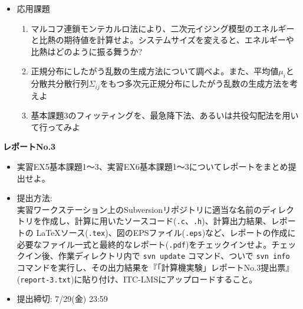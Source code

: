 \documentclass[11pt]{jarticle}
\begin{document}
\begin{itemize}
\item 応用課題
  \begin{enumerate}
  \item マルコフ連鎖モンテカルロ法により、二次元イジング模型のエネルギーと比熱の期待値を計算せよ。システムサイズを変えると、エネルギーや比熱はどのように振る舞うか?
  \item 正規分布にしたがう乱数の生成方法について調べよ。また、平均値$\mu_i$と分散共分散行列$\Sigma_{ij}$をもつ多次元正規分布にしたがう乱数の生成方法を考えよ
  \item 基本課題3のフィッティングを、最急降下法、あるいは共役勾配法を用いて行ってみよ
  \end{enumerate}  
\end{itemize}

\noindent
{\bf\large レポートNo.3}
\noindent
\begin{itemize}
\item 実習EX5基本課題1〜3、実習EX6基本課題1〜3についてレポートをまとめ提出せよ。
\item 提出方法: \\
  実習ワークステーション上のSubversionリポジトリに適当な名前のディレクトリを作成し、計算に用いたソースコード({\tt *.c}、{\tt *.h})、計算出力結果、レポートの \LaTeX ソース({\tt *.tex})、図のEPSファイル({\tt *.eps})など、レポートの作成に必要なファイル一式と最終的なレポート({\tt *.pdf})をチェックインせよ。チェックイン後、作業ディレクトリ内で {\tt svn update} コマンド、ついで {\tt svn info} コマンドを実行し、その出力結果を『「計算機実験」レポートNo.3提出票』({\tt report-3.txt})に貼り付け、ITC-LMSにアップロードすること。
\item 提出締切: 7/29(金) 23:59
\end{itemize}
\end{document}
